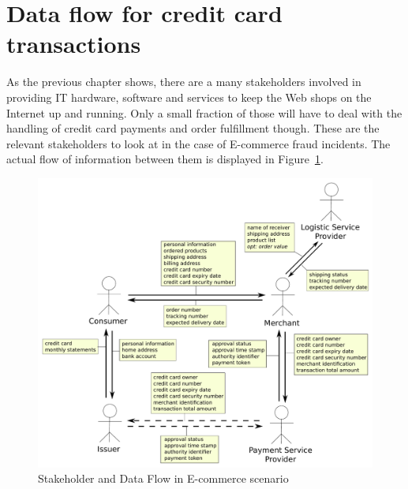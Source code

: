 
\section{Data flow for credit card transactions}
\label{sec:stakeholder_data_flow}

As the previous chapter shows, there are a many stakeholders involved in providing IT hardware, software and services to keep the Web shops on the Internet up and running. Only a small fraction of those will have to deal with the handling of credit card payments and order fulfillment though. These are the relevant stakeholders to look at in the case of E-commerce fraud incidents. The actual flow of information between them is displayed in  Figure~\ref{fig:images_e_commerce_stakeholder}. \@

\begin{figure}[H]
	\centering
		\includegraphics[width=0.8\columnwidth]{images/e-commerce-stakeholder.pdf}
	\caption{Stakeholder and Data Flow in E-commerce scenario}
\label{fig:images_e_commerce_stakeholder}
\end{figure}
